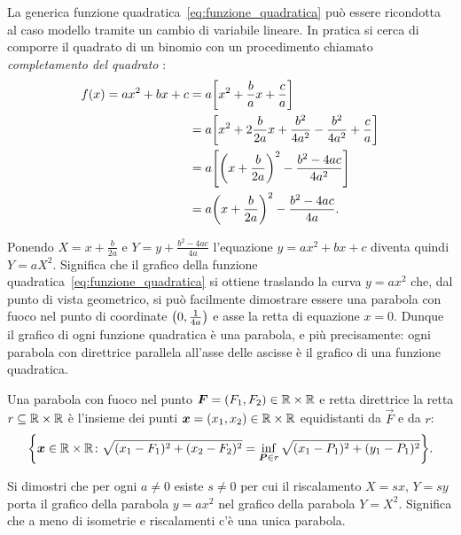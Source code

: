 La generica funzione quadratica~\eqref{eq:funzione_quadratica}
può essere ricondotta al caso modello tramite un cambio
di variabile lineare. In pratica si cerca di comporre il quadrato
di un binomio con un procedimento chiamato
\emph{completamento del quadrato}%
%
:
\begin{equation}\label{eq:24589}
\begin{aligned}
f(x) = ax^2+bx+c
  &= a {\left[ x^2+\frac b a x + \frac c a \right]}\\
  &= a {\left[ x^2+2 \frac{b}{2a} x + \frac{b^2}{4a^2} - \frac{b^2}{4a^2} + \frac c a \right]}\\
  &= a {\left[ {\left( x+\frac{b}{2a} \right)}^2 - \frac{b^2-4ac}{4a^2} \right]} \\
  &= a{\left( x+\frac b{2a} \right)}^2  - \frac{b^2-4ac}{4a}.
\end{aligned}
\end{equation}

Ponendo $X=x+\frac b{2a}$ e $Y=y+\frac{b^2-4ac}{4a}$
l'equazione $y=ax^2+bx+c$ diventa quindi $Y=aX^2$. 
Significa
che il grafico della funzione quadratica~\eqref{eq:funzione_quadratica}
si ottiene traslando la curva $y = a x^2$ che, 
dal punto di vista geometrico, si può facilmente
dimostrare essere una parabola con fuoco
nel punto di coordinate ${\left( 0,\frac 1 {4a} \right)}$
e asse la retta di equazione $x=0$.
Dunque il grafico di ogni funzione quadratica è una parabola, 
e più precisamente: ogni parabola con direttrice parallela all'asse delle
ascisse è il grafico di una funzione quadratica.

\begin{definition}[parabola]
  Una parabola con fuoco nel punto $\boldsymbol F=(F_1,F_2)\in {\mathbb R}\times {\mathbb R}$ 
  e retta direttrice 
  la retta $r \subseteq {\mathbb R}\times{\mathbb R}$ 
  è l'insieme dei punti  $\boldsymbol x = (x_1,x_2)\in {\mathbb R}\times{\mathbb R}$ 
  equidistanti da $\vec F$ e da $r$:
  \[
  {\left\{ \boldsymbol x\in {\mathbb R}\times{\mathbb R}\colon 
  \sqrt{(x_1-F_1)^2 + (x_2-F_2)^2} 
  = \inf_{\boldsymbol P\in r}\sqrt{(x_1-P_1)^2+(y_1-P_1)^2}
   \right\}}.
  \]
\end{definition}

\begin{exercise}
  Si dimostri che per ogni $a\neq 0$ esiste $s\neq 0$ 
  per cui il riscalamento $X=sx$, $Y=sy$ porta il grafico della 
  parabola $y=ax^2$ nel grafico della parabola $Y=X^2$.
  Significa che a meno di isometrie e riscalamenti c'è una 
  unica parabola.
\end{exercise}

